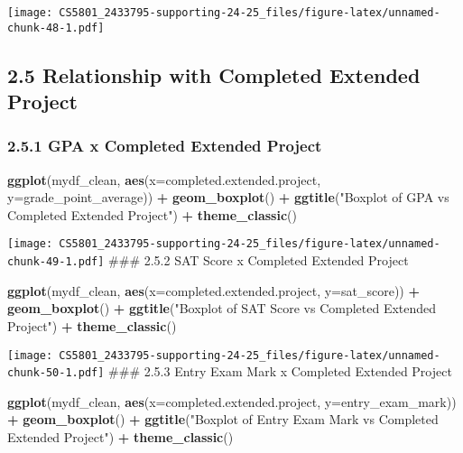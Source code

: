 \documentclass[
]{article}
\newenvironment{Shaded}{\begin{snugshade}}{\end{snugshade}}
\newcommand{\AttributeTok}[1]{\textcolor[rgb]{0.13,0.29,0.53}{#1}}
\newcommand{\FunctionTok}[1]{\textcolor[rgb]{0.13,0.29,0.53}{\textbf{#1}}}
\newcommand{\NormalTok}[1]{#1}
\newcommand{\SpecialCharTok}[1]{\textcolor[rgb]{0.81,0.36,0.00}{\textbf{#1}}}
\newcommand{\StringTok}[1]{\textcolor[rgb]{0.31,0.60,0.02}{#1}}
\begin{document}
\texttt{[image: CS5801\_2433795-supporting-24-25\_files/figure-latex/unnamed-chunk-48-1.pdf]}

\subsection{2.5 Relationship with Completed Extended
Project}\label{relationship-with-completed-extended-project}

\subsubsection{2.5.1 GPA x Completed Extended
Project}\label{gpa-x-completed-extended-project-1}

\begin{Shaded}
\begin{Highlighting}[]
\FunctionTok{ggplot}\NormalTok{(mydf\_clean, }\FunctionTok{aes}\NormalTok{(}\AttributeTok{x=}\NormalTok{completed.extended.project, }\AttributeTok{y=}\NormalTok{grade\_point\_average)) }\SpecialCharTok{+} \FunctionTok{geom\_boxplot}\NormalTok{() }\SpecialCharTok{+} \FunctionTok{ggtitle}\NormalTok{(}\StringTok{"Boxplot of GPA vs Completed Extended Project"}\NormalTok{) }\SpecialCharTok{+} \FunctionTok{theme\_classic}\NormalTok{()}
\end{Highlighting}
\end{Shaded}

\texttt{[image: CS5801\_2433795-supporting-24-25\_files/figure-latex/unnamed-chunk-49-1.pdf]}
\#\#\# 2.5.2 SAT Score x Completed Extended Project

\begin{Shaded}
\begin{Highlighting}[]
\FunctionTok{ggplot}\NormalTok{(mydf\_clean, }\FunctionTok{aes}\NormalTok{(}\AttributeTok{x=}\NormalTok{completed.extended.project, }\AttributeTok{y=}\NormalTok{sat\_score)) }\SpecialCharTok{+} \FunctionTok{geom\_boxplot}\NormalTok{() }\SpecialCharTok{+} \FunctionTok{ggtitle}\NormalTok{(}\StringTok{"Boxplot of SAT Score vs Completed Extended Project"}\NormalTok{) }\SpecialCharTok{+} \FunctionTok{theme\_classic}\NormalTok{()}
\end{Highlighting}
\end{Shaded}

\texttt{[image: CS5801\_2433795-supporting-24-25\_files/figure-latex/unnamed-chunk-50-1.pdf]}
\#\#\# 2.5.3 Entry Exam Mark x Completed Extended Project

\begin{Shaded}
\begin{Highlighting}[]
\FunctionTok{ggplot}\NormalTok{(mydf\_clean, }\FunctionTok{aes}\NormalTok{(}\AttributeTok{x=}\NormalTok{completed.extended.project, }\AttributeTok{y=}\NormalTok{entry\_exam\_mark)) }\SpecialCharTok{+} \FunctionTok{geom\_boxplot}\NormalTok{() }\SpecialCharTok{+} \FunctionTok{ggtitle}\NormalTok{(}\StringTok{"Boxplot of Entry Exam Mark vs Completed Extended Project"}\NormalTok{) }\SpecialCharTok{+} \FunctionTok{theme\_classic}\NormalTok{()}
\end{Highlighting}
\end{Shaded}
\end{document}
